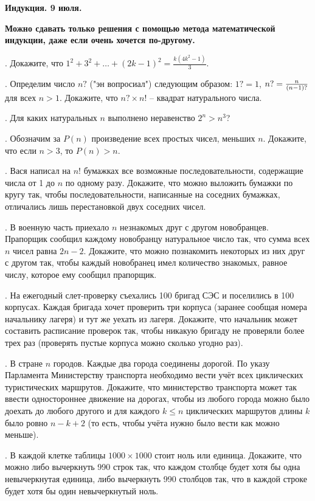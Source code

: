 \begin{center}
\Large
\textbf{Индукция. 9 июля. }
\end{center}  

\bigskip
\large
{\bf Можно сдавать только решения с помощью метода математической  индукции, даже если очень хочется по-другому.}

\bigskip

. Докажите, что $1^2+3^2+\ldots +(2k-1)^2 = \frac{k(4k^2-1)}{3}$.

\quad

. Определим число $n?$ ("эн вопросиал") следующим образом: $1? = 1$, 
$n?={n\over (n-1)?}$ для всех $n>1$. Докажите, что $n?\times n!$ -- 
квадрат натурального числа.

\quad


. Для каких натуральных $n$ выполнено неравенство $2^n>n^3$?


\quad




. Обозначим за $P(n)$ произведение всех простых чисел, меньших $n$. Докажите, что если $n>3$, то $P(n)>n$.

 
\quad




. Вася написал на $n!$ бумажках все возможные последовательности, содержащие числа от 1 до $n$ по одному разу. Докажите, что можно выложить бумажки по кругу так, чтобы последовательности, написанные на соседних бумажках, отличались лишь перестановкой двух соседних чисел. 


\quad


. В военную часть приехало $n$ незнакомых друг с другом новобранцев. Прапорщик сообщил каждому новобранцу натуральное число так, что сумма всех $n$ чисел равна $2n-2$. Докажите, что можно познакомить некоторых из них друг с другом так, чтобы каждый 
новобранец имел количество знакомых, равное числу, которое ему сообщил прапорщик.

\quad

. На ежегодный слет-проверку съехались 100 бригад СЭС и поселились в 100 корпусах. Каждая бригада хочет проверить три корпуса (заранее сообщая номера начальнику лагеря) и тут же уехать из лагеря. Докажите, что начальник может составить расписание проверок так,  чтобы никакую бригаду не проверяли более трех раз (проверять пустые корпуса можно сколько угодно раз).

\quad




. В стране $n$ городов. Каждые два города соединены дорогой. По указу Парламента Министерству транспорта необходимо вести учёт всех циклических туристических маршрутов. Докажите, что министерство транспорта может так ввести одностороннее движение на дорогах, чтобы из любого города можно было доехать до любого другого и для каждого $k\leqslant n$ циклических маршрутов длины $k$ было ровно $n-k+2$ (то есть, чтобы учёта нужно было вести как можно меньше). 

\quad

. В каждой клетке таблицы $1000\times 1000$ стоит ноль или единица. Докажите, что можно либо вычеркнуть 990 строк так, что каждом столбце будет хотя бы одна невычеркнутая единица, либо вычеркнуть 990 столбцов так, что в каждой строке будет хотя бы один невычеркнутый ноль.
